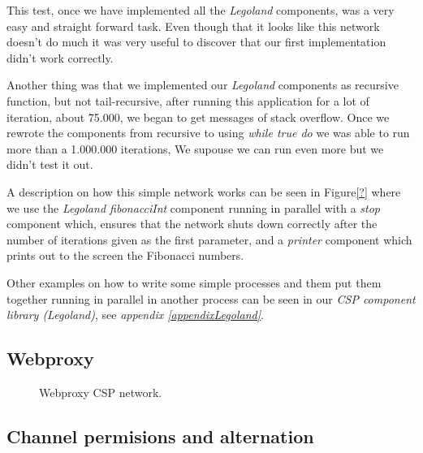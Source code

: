 \documentclass[a4paper,12pt]{article}
\begin{document}
This test, once we have implemented all the {\it Legoland}\cite{vintercsp}
components, was a very easy and straight forward task. Even though that it
looks like this network doesn't do much it was very useful to discover that
our first implementation didn't work correctly.

Another thing was that we implemented our {\it Legoland} components as
recursive function, but not tail-recursive, after running this application
for a lot of iteration, about 75.000, we began to get messages of stack
overflow. Once we rewrote the components from recursive to using {\it while true
do} we was able to run more than a 1.000.000 iterations, We supouse we can
run even more but we didn't test it out.

A description on how this simple network works can be seen in Figure\ref{?}
where we use the {\it Legoland fibonacciInt} component running in parallel
with a {\it stop} component which, ensures that the network shuts down correctly
after the number of iterations given as the first parameter, and a {\it printer}
component which prints out to the screen the Fibonacci numbers.

Other examples on how to write some simple processes and them put them together
running in parallel in another process can be seen in our {\it CSP component 
library (Legoland\cite{vintercsp})}, see  {\it appendix \ref{appendixLegoland}}.

\subsection{Webproxy}
\begin{figure}[h]
  \begin{center}
  \end{center}
  \caption{Webproxy CSP network.}
\end{figure}

\subsection{Channel permisions and alternation}
\end{document}
